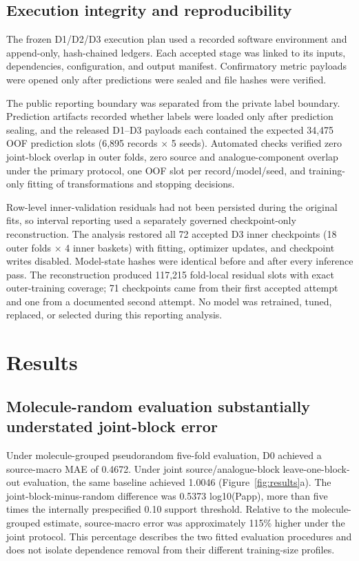 \documentclass[referee,lineno,pdflatex,sn-vancouver-num]{sn-jnl}
\begin{document}
\subsection{Execution integrity and reproducibility}

The frozen D1/D2/D3 execution plan used a recorded software environment and append-only, hash-chained ledgers. Each accepted stage was linked to its inputs, dependencies, configuration, and output manifest. Confirmatory metric payloads were opened only after predictions were sealed and file hashes were verified.

The public reporting boundary was separated from the private label boundary. Prediction artifacts recorded whether labels were loaded only after prediction sealing, and the released D1--D3 payloads each contained the expected 34,475 OOF prediction slots (6,895 records \ensuremath{\times} 5 seeds). Automated checks verified zero joint-block overlap in outer folds, zero source and analogue-component overlap under the primary protocol, one OOF slot per record/model/seed, and training-only fitting of transformations and stopping decisions.

Row-level inner-validation residuals had not been persisted during the original fits, so interval reporting used a separately governed checkpoint-only reconstruction. The analysis restored all 72 accepted D3 inner checkpoints (18 outer folds \ensuremath{\times} 4 inner baskets) with fitting, optimizer updates, and checkpoint writes disabled. Model-state hashes were identical before and after every inference pass. The reconstruction produced 117,215 fold-local residual slots with exact outer-training coverage; 71 checkpoints came from their first accepted attempt and one from a documented second attempt. No model was retrained, tuned, replaced, or selected during this reporting analysis.

\section{Results}

\subsection{Molecule-random evaluation substantially understated joint-block error}

Under molecule-grouped pseudorandom five-fold evaluation, D0 achieved a source-macro MAE of 0.4672. Under joint source/analogue-block leave-one-block-out evaluation, the same baseline achieved 1.0046 (Figure~\ref{fig:results}a). The joint-block-minus-random difference was 0.5373 log10(Papp), more than five times the internally prespecified 0.10 support threshold. Relative to the molecule-grouped estimate, source-macro error was approximately 115\% higher under the joint protocol. This percentage describes the two fitted evaluation procedures and does not isolate dependence removal from their different training-size profiles.
\end{document}

